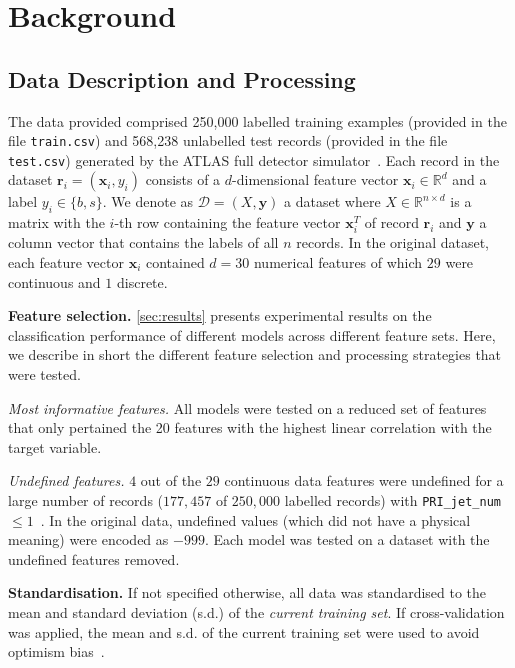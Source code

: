 \documentclass[10pt,conference,compsocconf]{IEEEtran}
\newcommand{\parabf}[1]{\vspace{1mm}\noindent\textbf{#1}}
\newcommand{\parait}[1]{\vspace{1mm}\noindent\textit{#1}}
\newcommand{\Data}{\mathcal{D}}
\newcommand{\features}{\mathbf{x}_i}
\newcommand{\target}{y_i}
\newcommand{\targetset}{\{ b, s \}}
\newcommand{\targetvector}{\mathbf{y}}
\begin{document}
\section{Background}

\subsection{Data Description and Processing}
\label{sec:data}
The data provided comprised 250,000 labelled training examples (provided in the file \texttt{train.csv}) and 568,238 unlabelled test records (provided in the file \texttt{test.csv}) generated by the ATLAS full detector simulator~\cite{HiggsML}.
Each record in the dataset $\mathbf{r}_i = (\features, \target)$ consists of a $d$-dimensional feature vector $\features \in \mathbb{R}^d$ and a label $\target \in \targetset$. We denote as $\Data = (X, \targetvector)$ a dataset where $X \in \mathbb{R}^{n \times d}$ is a matrix with the $i$-th row containing the feature vector $\features^T$ of record $\mathbf{r}_i$ and $\targetvector$ a column vector that contains the labels of all $n$ records.       
In the original dataset, each feature vector $\features$ contained $d=30$ numerical features of which $29$ were continuous and $1$ discrete.  

\parabf{Feature selection.} \autoref{sec:results} presents experimental results on the classification performance of different models across different feature sets. Here, we describe in short the different feature selection and processing strategies that were tested.

\parait{Most informative features.} All models were tested on a reduced set of features that only pertained the 20 features with the highest linear correlation with the target variable.

\parait{Undefined features.} $4$ out of the $29$ continuous data features were undefined for a large number of records ($177,457$ of $250,000$ labelled records) with \texttt{PRI\_jet\_num} $\leq 1$~\cite{OpenDataCERN}. In the original data, undefined values (which did not have a physical meaning) were encoded as $-999$. Each model was tested on a dataset with the undefined features removed. 

\parabf{Standardisation.} If not specified otherwise, all data was standardised to the mean and standard deviation (s.d.) of the \emph{current training set}. If cross-validation was applied, the mean and s.d. of the current training set were used to avoid optimism bias~\cite{Domingos2012}. 
\end{document}
